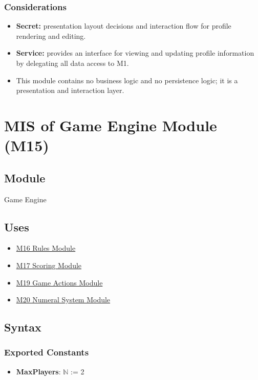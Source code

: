 \documentclass[12pt, titlepage]{article}
\begin{document}
\subsubsection{Considerations}
\begin{itemize}
    \item \textbf{Secret:} presentation layout decisions and interaction flow for profile rendering and editing.
    \item \textbf{Service:} provides an interface for viewing and updating profile information by delegating all data access to M1.
    \item This module contains no business logic and no persistence logic; it is a presentation and interaction layer.
\end{itemize}

\newpage
\section{MIS of Game Engine Module (M15)}\label{sec:game-engine-module}

\subsection{Module}
Game Engine

\subsection{Uses}
\begin{itemize}
    \item \hyperref[sec:rules-module]{M16 Rules Module}
    \item \hyperref[sec:scoring-module]{M17 Scoring Module}
    \item \hyperref[sec:game-actions-module]{M19 Game Actions Module}
    \item \hyperref[sec:numeral-system-module]{M20 Numeral System Module}
\end{itemize}

\subsection{Syntax}

\subsubsection{Exported Constants}
\begin{itemize}
    \item \textbf{MaxPlayers}: $\mathbb{N}$ := 2
\end{itemize}
\end{document}
